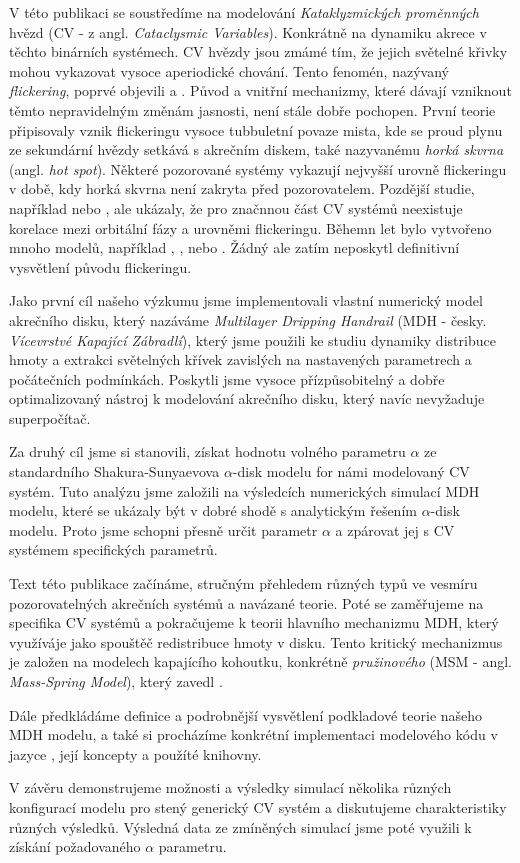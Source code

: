 V této publikaci se soustředíme na modelování \emph{Kataklyzmických proměnných} hvězd (CV - z angl. \emph{Cataclysmic Variables}). Konkrátně na dynamiku akrece v těchto binárních systémech. CV hvězdy jsou zmámé tím, že jejich světelné křivky mohou vykazovat vysoce aperiodické chování. Tento fenomén, nazývaný \emph{flickering}, poprvé objevili \citep{henize1949} a \citep{lenouvel1954}. Původ a vnitřní mechanizmy, které dávají vzniknout těmto nepravidelným změnám jasnosti, není stále dobře pochopen. První teorie připisovaly vznik flickeringu vysoce tubbuletní povaze mista, kde se proud plynu ze sekundární hvězdy setkává s akrečním diskem, také nazyvanému \emph{horká skvrna} (angl. \emph{hot spot}). Některé pozorované systémy vykazují nejvyšší urovně flickeringu v době, kdy horká skvrna není zakryta před pozorovatelem. Pozdější studie, například \citep{patterson1981} nebo \citep{wood1986}, ale ukázaly, že pro značnnou část CV systémů neexistuje  korelace mezi orbitální fázy a urovněmi flickeringu. Běhemn let bylo vytvořeno mnoho modelů, například \citep{dobrotka2012}, \citep{kley1997}, \citep{lyubarskii1997} nebo \citep{yonehara1997}. Žádný ale zatím neposkytl definitivní vysvětlení původu flickeringu.

Jako první cíl našeho výzkumu jsme implementovali vlastní numerický model akrečního disku, který nazáváme \emph{Multilayer Dripping Handrail} (MDH - česky. \emph{Vícevrstvé Kapající Zábradlí}), který jsme použili ke studiu dynamiky distribuce hmoty a extrakci světelných křívek zavislých na nastavených parametrech a počátečních podmínkách. Poskytli jsme vysoce přízpůsobitelný a dobře optimalizovaný nástroj k modelování akrečního disku, který navíc nevyžaduje superpočítač.

Za druhý cíl jsme si stanovili, získat hodnotu volného parametru $\alpha$ ze standardního Shakura-Sunyaevova $\alpha$-disk modelu for námi modelovaný CV systém. Tuto analýzu jsme založili na výsledcích numerických simulací MDH modelu, které se ukázaly být v dobré shodě s analytickým řešením $\alpha$-disk modelu. Proto jsme schopni přesně určit parametr $\alpha$ a zpárovat jej s CV systémem specifických parametrů.

Text této publikace začínáme, stručným přehledem různých typů ve vesmíru pozorovatelných akrečních systémů a navázané teorie. Poté se zaměřujeme na specifika CV systémů a pokračujeme k teorii hlavního mechanizmu MDH, který využíváje jako spouštěč redistribuce hmoty v disku. Tento kritický mechanizmus je založen na modelech kapajícího kohoutku, konkrétně \emph{pružinového} (MSM - angl. \emph{Mass-Spring Model}), který zavedl \citep{shaw1984}.

Dále předkládáme definice a podrobnější vysvětlení podkladové teorie našeho MDH modelu, a také si procházíme konkrétní implementaci modelového kódu v jazyce \CC, její koncepty a použíté knihovny. 

V závěru demonstrujeme možnosti a výsledky simulací několika různých konfigurací modelu pro stený generický CV systém a diskutujeme charakteristiky různých výsledků. Výsledná data ze zmíněných simulací jsme poté využili k získání požadovaného $\alpha$ parametru.
